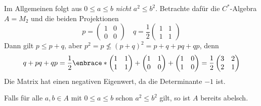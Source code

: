 \begin{beispiel}[{name=[Das Quadrat ist nicht monoton]}]
	Im Allgemeinen folgt aus $0 \le a \le b$ \emph{nicht} $a^2 \le b^2$. 
	Betrachte dafür die $C^*$-Algebra $A=M_2$ und die beiden Projektionen
	\[
		p =\begin{pmatrix}
			1 & 0 \\
			0 & 0
		\end{pmatrix} \quad q = \frac{1}{2} \begin{pmatrix}
			1 & 1 \\ 1 & 1
		\end{pmatrix}
	\]
	Dann gilt $p \le p+q$, aber $p^2=p \nleqslant (p+q)^2 = p + q+ pq + qp$, denn
	\[
		q + pq + qp = \frac{1}{2} \enbrace*{\begin{pmatrix}
			1 & 1 \\ 1 & 1
		\end{pmatrix} + \begin{pmatrix}
			1 & 1 \\ 0 & 0
		\end{pmatrix} + \begin{pmatrix}
			1 & 0 \\ 1 &0
		\end{pmatrix}} = \frac{1}{2} \begin{pmatrix}
			3 & 2 \\ 2 & 1
		\end{pmatrix}  
	\]
	Die Matrix hat einen negativen Eigenwert, da die Determinante $-1$ ist.
\end{beispiel}

\begin{bemerkung}[{name=[{wenn Quadrat monoton, dann $A$ abelsch}]}]
	Falls für alle $a,b \in A$ mit $0 \le a \le b$ schon $a^2 \le b^2$ gilt, so ist $A$ bereits abelsch.
\end{bemerkung}

